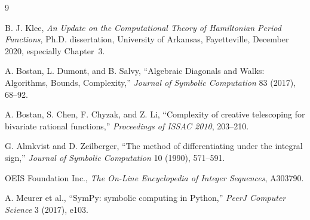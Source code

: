 \documentclass[11pt]{article}
\begin{document}
\begin{thebibliography}{9}

B. J. Klee,
\emph{An Update on the Computational Theory of Hamiltonian Period Functions},
Ph.D. dissertation, University of Arkansas, Fayetteville, December 2020,
especially Chapter~3.

A. Bostan, L. Dumont, and B. Salvy,
``Algebraic Diagonals and Walks: Algorithms, Bounds, Complexity,''
\emph{Journal of Symbolic Computation} 83 (2017), 68--92.

A. Bostan, S. Chen, F. Chyzak, and Z. Li,
``Complexity of creative telescoping for bivariate rational functions,''
\emph{Proceedings of ISSAC 2010}, 203--210.

G. Almkvist and D. Zeilberger,
``The method of differentiating under the integral sign,''
\emph{Journal of Symbolic Computation} 10 (1990), 571--591.

OEIS Foundation Inc., \emph{The On-Line Encyclopedia of Integer Sequences},
A303790.

A. Meurer et al.,
``SymPy: symbolic computing in Python,''
\emph{PeerJ Computer Science} 3 (2017), e103.

\end{thebibliography}
\end{document}
